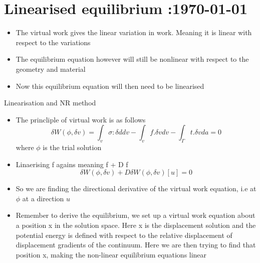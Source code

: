 




	\tableofcontents
	\section{Linearised equilibrium :\today}


	\begin{frame}
		\begin{itemize}
			\item The virtual work gives the linear variation in work. Meaning it is linear with respect to the variations
			\item The equilibrium equation however will still be nonlinear with respect to the geometry and material
			\item Now this equilibrium equation will then need to be linearised
			
		\end{itemize}
	\end{frame}


	\begin{frame}{Linearisation and NR method}
		\begin{itemize}
			\item The princliple of virtual work is as follows 
			\begin{equation}
				\delta W(\phi,\delta v) = \int_v \sigma : \delta d dv - \int_v f.\delta v dv - \int_{\Gamma} t.\delta v da = 0
			\end{equation}
			where $\phi$ is the trial solution
			\item Linaerising f agains meaning f + D f
			\begin{equation}
			\delta W(\phi,\delta v) + D\delta W(\phi,\delta v)[u] = 0
			\end{equation}
			\item So we are finding the directional derivative of the virtual work equation, i.e at $\phi$ at a direction $u$
			\item Remember to derive the equilibrium, we set up a virtual work equation about a position x in the solution space. Here x is the displacement solution and the potential energy is defined with respect to the relative displacement of displacement gradients of the continuum. Here we are then trying to find that position x, making the non-linear equilibrium equations linear
		\end{itemize}
	\end{frame}

